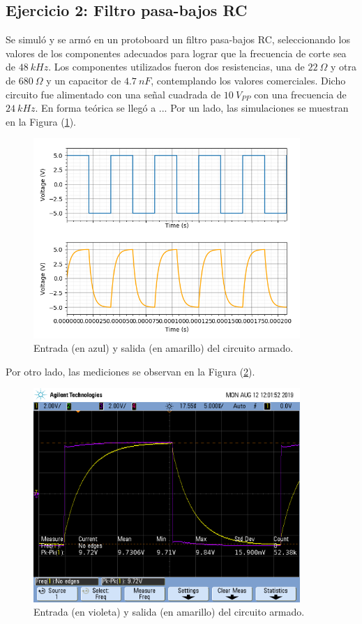 \documentclass[a4paper]{article}
\begin{document}
\subsection{Ejercicio 2: Filtro pasa-bajos RC}
Se simuló y se armó en un protoboard un filtro pasa-bajos RC, seleccionando los valores de los componentes adecuados para lograr que la frecuencia de corte sea de $ 48 \ kHz $. Los componentes utilizados fueron dos resistencias, una de $22 \ \Omega$ y otra de $680 \ \Omega$ y un capacitor de $4.7 \ nF$, contemplando los valores comerciales.
Dicho circuito fue alimentado con una señal cuadrada de $ 10 \ V_{PP} $ con una frecuencia de $ 24 \ kHz $.
En forma teórica se llegó a ...
Por un lado, las simulaciones se muestran en la Figura (\ref{fig:simu2}).

\begin{figure}[H]
	\centering
	\includegraphics[width=0.9\textwidth]{Entrada-Salida.png}
\caption{Entrada (en azul) y salida (en amarillo) del circuito armado.}
	\label{fig:simu2}
\end{figure}

Por otro lado, las mediciones se observan en la Figura (\ref{fig:medicion2}).

\begin{figure}[H]
	\centering
	\includegraphics[width=0.9\textwidth , trim={0.7cm 6.25cm  0 3.5cm},clip]{scope_1}
\caption{Entrada (en violeta) y salida (en amarillo) del circuito armado.}
	\label{fig:medicion2}
\end{figure}
\end{document}
